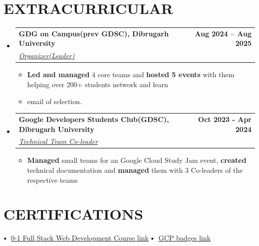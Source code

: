 \documentclass[letterpaper,11pt]{article}
\makeatletter
\newcommand{\resumeItem}[1]{
    \item\small{
            {#1 \vspace{-2pt}}
        }
    }
\newcommand{\resumeSubheading}[4]{
        \vspace{-2pt}\item
        \begin{tabular*}{1.0\textwidth}[t]{l@{\extracolsep{\fill}}r}
            \textbf{\large#1} & \textbf{\small #2} \\
            \textit{\large#3} & \textit{\small #4} \\

        \end{tabular*}\vspace{-7pt}
    }
\newcommand{\resumeSubHeadingListStart}{\begin{itemize}[leftmargin=0.0in, label={}]}
\newcommand{\resumeSubHeadingListEnd}{\end{itemize}}
\newcommand{\resumeItemListStart}{\begin{itemize}}
\newcommand{\resumeItemListEnd}{\end{itemize}\vspace{-5pt}}
\newcommand\sbullet[1][.5]{\mathbin{\vcenter{\hbox{\scalebox{#1}{$\bullet$}}}}}
\makeatother
\begin{document}
\section{EXTRACURRICULAR}
\resumeSubHeadingListStart
\resumeSubheading{GDG on Campus(prev GDSC), Dibrugarh University\href{https://gdg.community.dev/gdg-on-campus-dibrugarh-university-dibrugarh-india/}{\raisebox{-0.1\height}\faExternalLink}}{Aug 2024 -- Aug 2025}{\underline{Organizer(Leader)}}{}
\resumeItemListStart
\resumeItem{\normalsize{\textbf{Led and managed} 4 core teams and \textbf{hosted 5 events} with them helping over 200+ students network and learn}}
\resumeItem{\normalsize{email of selection.\href{https://www.linkedin.com/in/milinda-barua/overlay/1739075889047/single-media-viewer/?profileId=ACoAAEPBtm4B6hu2mxVjWHK1bhmW2EnUnVz3F6k}{\raisebox{-0.1\height}\faExternalLink}}}
\resumeItemListEnd
\resumeSubheading{Google Developers Students Club(GDSC), Dibrugarh University{\raisebox{-0.1\height}\faExternalLink}}{Oct 2023 - Apr 2024}{\underline{Technical Team Co-leader}}{}
\resumeItemListStart
\resumeItem{\normalsize{\textbf{Managed} small teams for an Google Cloud Study Jam event, \textbf{created} technical documentation and \textbf{managed} them with 3 Co-leaders of the respective teams}}
\resumeItemListEnd
\resumeSubHeadingListEnd
\vspace{-11pt}

\section{CERTIFICATIONS}

$\sbullet[.75] \hspace{0.1cm}$ \href{https://drive.google.com/file/d/1EH_jUK-UUidX4LybD7Xez974SCDGPA1C/view?usp=sharing}{0-1 Full Stack Web Development Course link} \hspace{1.6cm}
$\sbullet[.75] \hspace{0.1cm}$ {\href{https://www.cloudskillsboost.google/public_profiles/d88db451-eb32-437f-8c4a-39f9006e991e}{GCP badges link}} \hspace{2.59cm} \\
\end{document}
